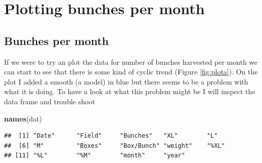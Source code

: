 \documentclass[]{book}
\newenvironment{Shaded}{\begin{snugshade}}{\end{snugshade}}
\newcommand{\KeywordTok}[1]{\textcolor[rgb]{0.13,0.29,0.53}{\textbf{{#1}}}}
\newcommand{\DataTypeTok}[1]{\textcolor[rgb]{0.13,0.29,0.53}{{#1}}}
\newcommand{\DecValTok}[1]{\textcolor[rgb]{0.00,0.00,0.81}{{#1}}}
\newcommand{\FloatTok}[1]{\textcolor[rgb]{0.00,0.00,0.81}{{#1}}}
\newcommand{\StringTok}[1]{\textcolor[rgb]{0.31,0.60,0.02}{{#1}}}
\newcommand{\NormalTok}[1]{{#1}}
\theoremstyle{definition}
\theoremstyle{definition}
\theoremstyle{remark}
\begin{document}
\section{Plotting bunches per month}\label{plotting-bunches-per-month}

\subsection{Bunches per month}\label{bunches-per-month}

If we were to try an plot the data for number of bunches harvested per
month we can start to see that there is some kind of cyclic trend
(Figure \ref{fig:plota}). On the plot I added a smooth (a model) in blue
but there seems to be a problem with what it is doing. To have a look at
what this problem might be I will inspect the data frame and trouble
shoot

\begin{Shaded}
\begin{Highlighting}[]
\KeywordTok{names}\NormalTok{(dat)}
\end{Highlighting}
\end{Shaded}

\begin{verbatim}
##  [1] "Date"      "Field"     "Bunches"   "XL"        "L"        
##  [6] "M"         "Boxes"     "Box/Bunch" "weight"    "%XL"      
## [11] "%L"        "%M"        "month"     "year"
\end{verbatim}

\begin{Shaded}
\end{Shaded}
\end{document}
